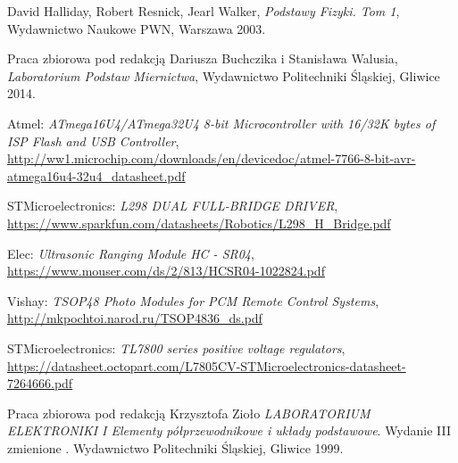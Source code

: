 \documentclass[11pt]{article}
\begin{document}
\begin{thebibliography}{9}

David Halliday, Robert Resnick, Jearl Walker,
\textit{Podstawy Fizyki. Tom 1},
Wydawnictwo Naukowe PWN, Warszawa 2003.

Praca zbiorowa pod redakcją Dariusza Buchczika i Stanisława Walusia,
\textit{Laboratorium Podstaw Miernictwa},
Wydawnictwo Politechniki Śląskiej, Gliwice 2014.

Atmel: \textit{ATmega16U4/ATmega32U4 8-bit Microcontroller with 16/32K bytes of ISP Flash and USB Controller}, \url{http://ww1.microchip.com/downloads/en/devicedoc/atmel-7766-8-bit-avr-atmega16u4-32u4\_datasheet.pdf}

STMicroelectronics: \textit{L298
DUAL FULL-BRIDGE DRIVER}, \url{https://www.sparkfun.com/datasheets/Robotics/L298_H_Bridge.pdf}

Elec: \textit{Ultrasonic Ranging Module HC - SR04}, \url{https://www.mouser.com/ds/2/813/HCSR04-1022824.pdf}

Vishay: \textit{TSOP48 Photo Modules for PCM Remote Control Systems}, \url{http://mkpochtoi.narod.ru/TSOP4836_ds.pdf}

STMicroelectronics: \textit{TL7800 series positive voltage regulators}, \url{https://datasheet.octopart.com/L7805CV-STMicroelectronics-datasheet-7264666.pdf}

Praca zbiorowa pod redakcją Krzysztofa Zioło
\textit{LABORATORIUM ELEKTRONIKI I Elementy półprzewodnikowe i układy podstawowe}.
Wydanie III zmienione .
Wydawnictwo Politechniki Śląskiej, Gliwice 1999.

\end{thebibliography}
\end{document}
